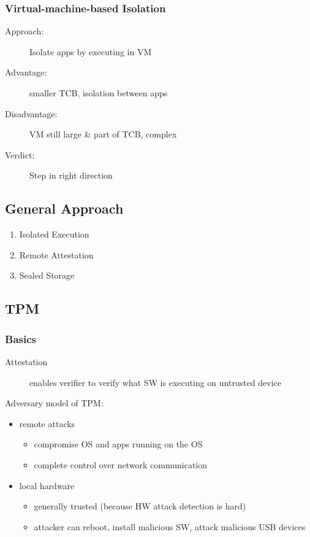 \subsubsection{Virtual-machine-based Isolation}
\begin{description}
	\item[Approach:] Isolate apps by executing in VM
	\item[Advantage:] smaller TCB, isolation between apps
	\item[Disadvantage:] VM still large \& part of TCB, complex
	\item[Verdict:] Step in right direction
\end{description}

\subsection{General Approach}
\begin{enumerate}
	\item Isolated Execution
	\item Remote Attestation
	\item Sealed Storage
\end{enumerate}

\subsection{TPM}
\subsubsection{Basics}
\begin{description}
    \item[Attestation] enables verifier to verify what SW is executing on untrusted device
\end{description}
Adversary model of TPM:
\begin{itemize}
    \item remote attacks
        \begin{itemize}
            \item compromise OS and apps running on the OS
            \item complete control over network communication
        \end{itemize}
    \item local hardware
        \begin{itemize}
            \item generally trusted (because HW attack detection is hard)
            \item attacker can reboot, install malicious SW, attack malicious USB devices
        \end{itemize}
\end{itemize}

